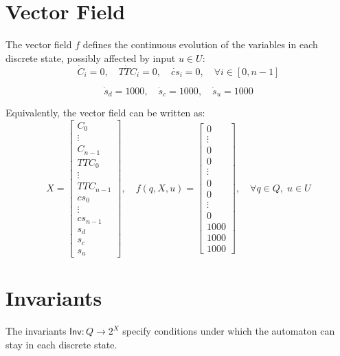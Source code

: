 \documentclass[12pt]{article}
\theoremstyle{definition}
\begin{document}
\section{Vector Field}
The vector field $f$ defines the continuous evolution of the variables in each discrete state, possibly affected by input $u \in U$:
\[
\dot{C}_i = 0, \quad \dot{TTC}_i = 0, \quad \dot{cs}_i = 0, \quad \forall i \in [0,n-1]
\]

\[
\dot{s}_d = 1000, \quad \dot{s}_c = 1000, \quad \dot{s}_u = 1000
\]

Equivalently, the vector field can be written as:
\[
X = 
\begin{bmatrix}
    C_0 \\ \vdots \\ C_{n-1} \\ 
    TTC_0 \\ \vdots \\ TTC_{n-1} \\ 
    cs_0 \\ \vdots \\ cs_{n-1} \\ 
    s_d \\ s_c \\ s_u
\end{bmatrix}, \quad
f(q, X, u) =
\begin{bmatrix}
    0 \\ \vdots \\ 0 \\ 
    0 \\ \vdots \\ 0 \\ 
    0 \\ \vdots \\ 0 \\ 
    1000 \\ 1000 \\ 1000
\end{bmatrix}, \quad \forall q \in Q, \; u \in U
\]

\section{Invariants}

The invariants $\mathsf{Inv}: Q \to 2^X$ specify conditions under which the automaton can stay in each discrete state.
\end{document}
